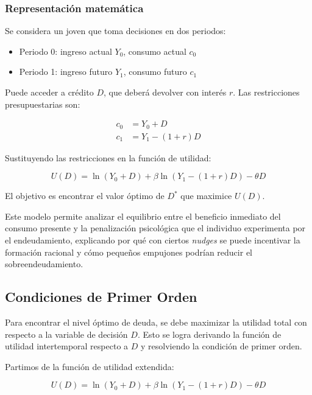 \documentclass[10pt]{article}
\begin{document}
\begin{multicols}{2}
\subsubsection*{Representación matemática}

Se considera un joven que toma decisiones en dos periodos:
\begin{itemize}
    \item Periodo 0: ingreso actual $Y_0$, consumo actual $c_0$
    \item Periodo 1: ingreso futuro $Y_1$, consumo futuro $c_1$
\end{itemize}

Puede acceder a crédito $D$, que deberá devolver con interés $r$. Las restricciones presupuestarias son:

\begin{align}
    c_0 &= Y_0 + D \\
    c_1 &= Y_1 - (1+r)D
\end{align}

Sustituyendo las restricciones en la función de utilidad:

\begin{equation}
U(D) = \ln(Y_0 + D) + \beta \ln(Y_1 - (1+r)D) - \theta D
\end{equation}

\noindent El objetivo es encontrar el valor óptimo de $D^*$ que maximice $U(D)$.

Este modelo permite analizar el equilibrio entre el beneficio inmediato del consumo presente y la penalización psicológica que el individuo experimenta por el endeudamiento, explicando por qué con ciertos \textit{nudges} se puede incentivar la formación racional y cómo pequeños empujones podrían reducir el sobreendeudamiento.

\subsection{Condiciones de Primer Orden}

Para encontrar el nivel óptimo de deuda, se debe maximizar la utilidad total con respecto a la variable de decisión $D$. Esto se logra derivando la función de utilidad intertemporal respecto a $D$ y resolviendo la condición de primer orden.

Partimos de la función de utilidad extendida:

\begin{equation}
U(D) = \ln (Y_0 + D) + \beta \ln \left( Y_1 - (1 + r)D \right) - \theta D
\end{equation}


\end{multicols}
\end{document}
